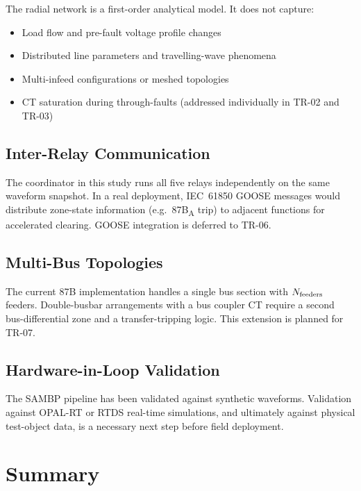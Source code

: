 \documentclass[12pt,a4paper]{article}
\begin{document}
The radial network is a first-order analytical model.  It does not
capture:
\begin{itemize}
  \item Load flow and pre-fault voltage profile changes
  \item Distributed line parameters and travelling-wave phenomena
  \item Multi-infeed configurations or meshed topologies
  \item CT saturation during through-faults (addressed individually in
        TR-02 and TR-03)
\end{itemize}

\subsection{Inter-Relay Communication}

The coordinator in this study runs all five relays independently on the
same waveform snapshot.  In a real deployment, IEC~61850 GOOSE messages
would distribute zone-state information (e.g.\ 87B\textsubscript{A}
trip) to adjacent functions for accelerated clearing.  GOOSE integration
is deferred to TR-06.

\subsection{Multi-Bus Topologies}

The current 87B implementation handles a single bus section with
$N_{\rm feeders}$ feeders.  Double-busbar arrangements with a bus
coupler CT require a second bus-differential zone and a transfer-tripping
logic.  This extension is planned for TR-07.

\subsection{Hardware-in-Loop Validation}

The SAMBP pipeline has been validated against synthetic waveforms.
Validation against OPAL-RT or RTDS real-time simulations, and ultimately
against physical test-object data, is a necessary next step before
field deployment.

\section{Summary}
\end{document}

